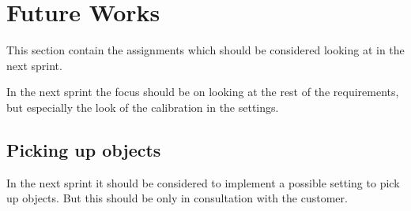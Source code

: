 \section{Future Works}
This section contain the assignments which should be considered looking at in the next sprint.

In the next sprint the focus should be on looking at the rest of the requirements, but especially the look of the calibration in the settings.

\subsection{Picking up objects}
In the next sprint it should be considered to implement a possible setting to pick up objects.
But this should be only in consultation with the customer.
